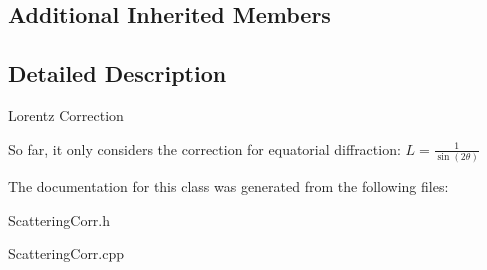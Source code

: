 \subsection*{Additional Inherited Members}


\subsection{Detailed Description}
Lorentz Correction

So far, it only considers the correction for equatorial diffraction\+: $ L = \frac{1}{\sin(2\theta)} $ 

The documentation for this class was generated from the following files\+:\begin{DoxyCompactItemize}
\item 
Scattering\+Corr.\+h\item 
Scattering\+Corr.\+cpp\end{DoxyCompactItemize}
